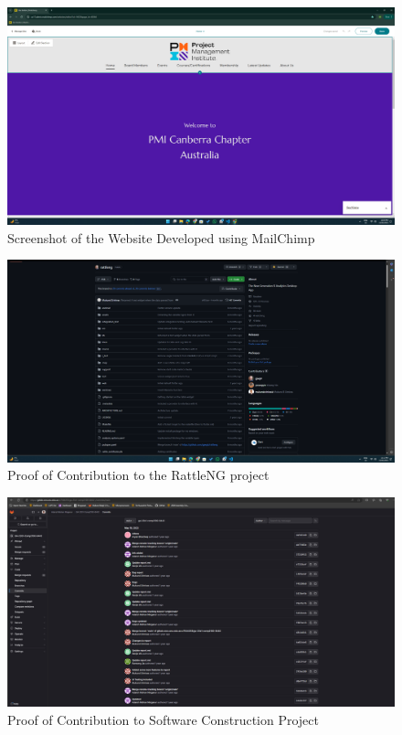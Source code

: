 \documentclass{article}
\begin{document}
\begin{figure}[ht!]
    \centering
    \includegraphics[width=\textwidth, height=0.4\textheight, keepaspectratio]{../PMICanberra_Work.png}
    \caption{Screenshot of the Website Developed using MailChimp}
    \label{fig:PMI Canberra}
\end{figure}

\begin{figure}[ht!]
    \centering
    \includegraphics[width=\textwidth, height=0.4\textheight, keepaspectratio]{../rattleng_Experience.png}
    \caption{Proof of Contribution to the RattleNG project}
    \label{fig:RattleNG}
\end{figure}

\begin{figure}[ht!]
    \centering
    \includegraphics[width=\textwidth, height=0.4\textheight, keepaspectratio]{../Software_Construction_Proof.png}
    \caption{Proof of Contribution to Software Construction Project}
    \label{fig:Software Construction}
\end{figure}
\end{document}
